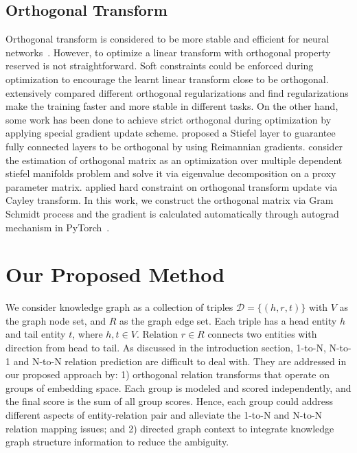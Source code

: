 \documentclass[11pt,a4paper]{article}
\begin{document}
\subsection{Orthogonal Transform}
Orthogonal transform is considered to be more stable and efficient for neural networks~\cite{Saxe2013ExactST,Vorontsov2017OnOA}. 
However, to optimize a linear transform with orthogonal property reserved is not straightforward.  Soft constraints could be enforced during optimization to encourage the learnt linear transform close to be orthogonal. \citet{Bansal2018CanWG} extensively compared different orthogonal regularizations and find regularizations make the training faster and more stable in different tasks. On the other hand, some work has been done to achieve strict orthogonal during optimization by applying special gradient update scheme. \citet{Harandi2016GeneralizedB} proposed a Stiefel layer to guarantee fully connected layers to be orthogonal by using Reimannian gradients. \citet{Huang2017OrthogonalWN} consider the estimation of orthogonal matrix as an optimization over multiple dependent stiefel manifolds problem and  solve it via eigenvalue decomposition on a proxy parameter matrix.
\citet{Vorontsov2017OnOA} applied hard constraint on orthogonal transform update via Cayley transform. In this work, we construct the orthogonal matrix via Gram Schmidt process and the gradient is calculated automatically through autograd mechanism in PyTorch~\cite{paszke2017automatic}.







\section{Our Proposed Method}

We consider knowledge graph as a collection of triples $\mathcal{D}=\{(h,r,t)\}$ with $V$ as the graph node set, and $R$ as the graph edge set. Each triple has a head entity $h$ and tail entity $t$, where $h,t\in V$. Relation $r\in R$ connects two entities with direction from head to tail.
As discussed in the introduction section, 1-to-N, N-to-1 and N-to-N relation prediction \cite{bordes2013translating,wang2014knowledge} are difficult to deal with. They are addressed in our proposed approach by: 1) orthogonal relation transforms that operate on groups of embedding space. Each group is modeled and scored independently, and the final score is the sum of all group scores. Hence, each group could address different aspects of entity-relation pair and alleviate the 1-to-N and N-to-N relation mapping issues; and 2) directed graph context to integrate knowledge graph structure information to reduce the ambiguity. 
\end{document}
